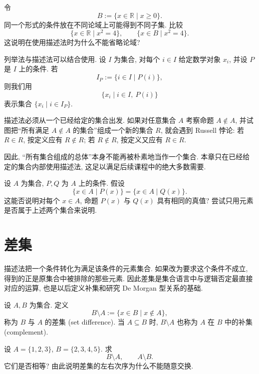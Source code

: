 \documentclass[usesamecnt, thmcnt=section, lang=cn, newtx, 10pt, scheme=chinese]{elegantbook}
\begin{document}
\begin{exercise}\label{ex:sets-builder-02}
令
\[
 B:=\{x\in\mathbb R\mid x\geq0\}.
\]
同一个形式的条件放在不同论域上可能得到不同子集. 比较
\[
 \{x\in\mathbb R\mid x^2=4\},
 \qquad
 \{x\in B\mid x^2=4\}.
\]
这说明在使用描述法时为什么不能省略论域?
\end{exercise}

列举法与描述法可以结合使用. 设 $I$ 为集合, 对每个 $i\in I$ 给定数学对象 $x_i$, 并设 $P $ 是 $I$ 上的条件. 若
\[
 I_P:=\{i\in I\mid P(i)\},
\]
则我们用
\[
 \{x_i\mid i\in I,\ P(i)\}
\]
表示集合 $\{x_i\mid i\in I_P\}$.

\begin{knowledge}[Russell 悖论]
描述法必须从一个已经给定的集合出发. 如果对任意集合 $A$ 考察命题 $A\notin A$, 并试图把``所有满足 $A\notin A$ 的集合''组成一个新的集合 $R$, 就会遇到 Russell 悖论: 若 $R\in R$, 按定义应有 $R\notin R$; 若 $R\notin R$, 按定义又应有 $R\in R$.

因此, ``所有集合组成的总体''本身不能再被朴素地当作一个集合. 本章只在已经给定的集合内部使用描述法, 这足以满足后续课程中的绝大多数需要.
\end{knowledge}

\begin{challenge}\label{ch:sets-02}
设 $A$ 为集合, $P ,Q $ 为 $A$ 上的条件. 假设
\[
 \{x\in A\mid P(x)\}=\{x\in A\mid Q(x)\}.
\]
这能否说明对每个 $x\in A$, 命题 $P(x)$ 与 $Q(x)$ 具有相同的真值? 尝试只用元素是否属于上述两个集合来说明.
\end{challenge}

\section{差集}

描述法把一个条件转化为满足该条件的元素集合. 如果改为要求这个条件不成立, 得到的正是原集合中被排除的那些元素. 因此差集是集合语言中与逻辑否定最直接对应的运算, 也是以后定义补集和研究 De Morgan 型关系的基础.

\begin{definition}\label{def:sets-difference}
设 $A,B$ 为集合. 定义
\[
 B\setminus A:=\{x\in B\mid x\notin A\},
\]
称为 $B$ 与 $A$ 的{\color{blue}差集 (set difference)}. 当 $A\subseteq B$ 时, $B\setminus A$ 也称为 $A$ 在 $B$ 中的{\color{blue}补集 (complement)}.
\end{definition}

\begin{concept}\label{con:sets-08}
设 $A=\{1,2,3\}$, $B=\{2,3,4,5\}$. 求
\[
 B\setminus A,\qquad A\setminus B.
\]
它们是否相等? 由此说明差集的左右次序为什么不能随意交换.
\end{concept}
\end{document}
